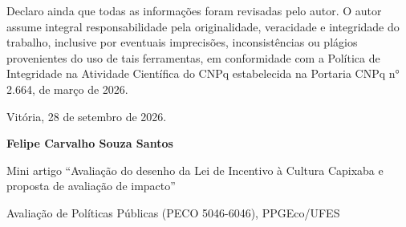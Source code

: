 \documentclass[12pt,a4paper]{article}
\begin{document}
Declaro ainda que todas as informações foram revisadas pelo autor. O autor assume integral
responsabilidade pela originalidade, veracidade e integridade do trabalho, inclusive por eventuais
imprecisões, inconsistências ou plágios provenientes do uso de tais ferramentas, em conformidade com
a Política de Integridade na Atividade Científica do CNPq estabelecida na Portaria CNPq n° 2.664, de
março de 2026.
\par\endgroup
\vspace{14pt}
\begin{center}
Vitória, 28 de setembro de 2026.\par
\textbf{Felipe Carvalho Souza Santos}\par
{\small Mini artigo ``Avaliação do desenho da Lei de Incentivo à Cultura Capixaba e proposta de avaliação de impacto''\par}
{\small Avaliação de Políticas Públicas (PECO 5046-6046), PPGEco/UFES\par}
\end{center}
\end{document}
